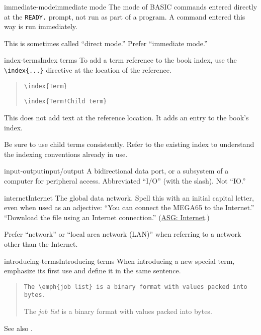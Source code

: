 \begin{sgentry}{immediate-mode}{immediate mode}
    The mode of BASIC commands entered directly at the \texttt{READY.} prompt, not run as part of a program. A command entered this way is run immediately.

    This is sometimes called ``direct mode.'' Prefer ``immediate mode.''
\end{sgentry}

\begin{sgentry}{index-terms}{Index terms}
    To add a term reference to the book index, use the \texttt{{\textbackslash}index\{...\}} directive at the location of the reference.

    \begin{quote}
        \texttt{{\textbackslash}index\{Term\}}

        \hrulefill

        \texttt{{\textbackslash}index\{Term!Child term\}}
    \end{quote}

    This does not add text at the reference location. It adds an entry to the book's index.

    Be sure to use child terms consistently. Refer to the existing index to understand the indexing conventions already in use.
\end{sgentry}

\begin{sgentry}{input-output}{input/output}
    A bidirectional data port, or a subsystem of a computer for peripheral access. Abbreviated ``I/O'' (with the slash). Not ``IO.''
\end{sgentry}

\begin{sgentry}{internet}{Internet}
    The global data network. Spell this with an initial capital letter, even when used as an adjective: ``You can connect the MEGA65 to the Internet.'' ``Download the file using an Internet connection.'' (\href{https://support.apple.com/en-my/guide/applestyleguide/apsg346ef241/web}{ASG: Internet}.)

    Prefer ``network'' or ``local area network (LAN)'' when referring to a network other than the Internet.
\end{sgentry}

\begin{sgentry}{introducing-terms}{Introducing terms}
    When introducing a new special term, emphasize its first use and define it in the same sentence.

    \begin{quote}
        \texttt{The {\textbackslash}emph\{job list\} is a binary format with values packed into bytes.}

        \hrulefill

        The \emph{job list} is a binary format with values packed into bytes.
    \end{quote}

    See also .
\end{sgentry}

